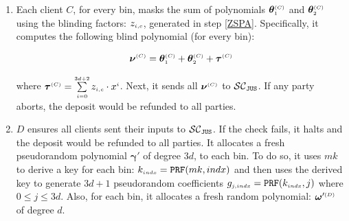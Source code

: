 \begin{enumerate}
\item\label{blindPoly-C-sends-to-contract} Each client $ C$, for every bin, masks the sum of polynomials $\bm\theta^{\scriptscriptstyle  {  {(C)}}}_{\scriptscriptstyle 1}$ and $\bm\theta^{\scriptscriptstyle  {  {(C)}}}_{\scriptscriptstyle 2}$  using the blinding factors: $z_{\scriptscriptstyle i,c}$, generated in step \ref{ZSPA}. Specifically, it computes the following blind polynomial (for every bin):  

$$\bm\nu^{ \scriptscriptstyle {  {(C)}} }= \bm\theta^{ \scriptscriptstyle {  {(C)}}}_{\scriptscriptstyle 1}+\bm\theta^{\scriptscriptstyle  {  {(C)}}}_{\scriptscriptstyle 2}+\bm \tau^{\scriptscriptstyle  {  {(C)}} }$$

where $\bm\tau^{\scriptscriptstyle  {  {(C)}}}=\sum\limits^{\scriptscriptstyle 3d+2}_{\scriptscriptstyle i=0}z_{\scriptscriptstyle i,c}\cdot x^{\scriptscriptstyle i}$. Next, it sends  all $\bm\nu^{\scriptscriptstyle  {  {(C)}} }$ to $\mathcal{SC}_{\mathtt{JUS}}$. If any party aborts, the deposit would be refunded to all parties.










\item\label{f-psi::D-gen-random-poly} ${D}$ ensures all clients sent their inputs to $\mathcal{SC}_{\mathtt{JUS}}$. If the check fails, it halts and the deposit would be refunded to all parties. It allocates a fresh pseudorandom polynomial $\bm\gamma'$ of degree $3d$, to each bin. To do so, it uses $mk$ to derive a key for each bin: $k_{\scriptscriptstyle  { {indx}}}=\mathtt{PRF}(mk, {    {   {indx}}})$ and then uses the derived key to generate $3d+1$ pseudorandom coefficients $g_{\scriptscriptstyle  { {j,indx}}}=\mathtt{PRF}(k_{\scriptscriptstyle  { {indx}}}, j)$ where $ 0\leq j \leq 3d$. Also, for each bin, it allocates a fresh random polynomial:  $\bm\omega'^{\scriptscriptstyle  {  {(D)}}}$ of degree $d$. 


\end{enumerate}
